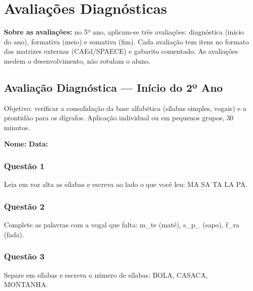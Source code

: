 
\chapter{Avaliações Diagnósticas}

\textbf{Sobre as avaliações:} no 5º ano, aplicam-se três avaliações: diagnóstica (início do ano), formativa (meio) e somativa (fim). Cada avaliação tem itens no formato das matrizes externas (CAEd/SPAECE) e gabarito comentado. As avaliações medem o desenvolvimento, não rotulam o aluno.

\section{Avaliação Diagnóstica — Início do 2º Ano}

\begin{avaliacao}
Objetivo: verificar a consolidação da base alfabética (sílabas simples, vogais) e a prontidão para os dígrafos. Aplicação individual ou em pequenos grupos, 30 minutos.
\end{avaliacao}

\noindent\textbf{Nome:} \underline{\hspace{4cm}} \quad \textbf{Data:} \underline{\hspace{2cm}}

\subsection*{Questão 1}
Leia em voz alta as sílabas e escreva ao lado o que você leu: MA  SA  TA  LA  PA.

\begin{center}
  \underline{\hspace{12cm}}
\end{center}

\subsection*{Questão 2}
Complete as palavras com a vogal que falta: m\_te (maté), s\_p\_ (sapo), f\_ra (fada).

\begin{center}
  \underline{\hspace{12cm}}
\end{center}

\subsection*{Questão 3}
Separe em sílabas e escreva o número de sílabas: BOLA, CASACA, MONTANHA.


